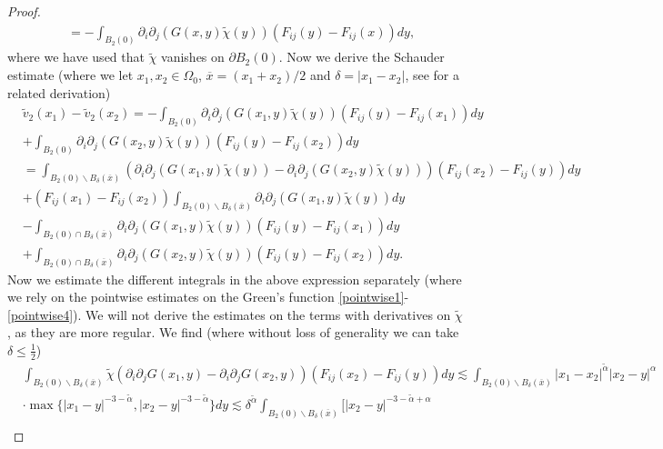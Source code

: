 \documentclass[12pt,a4paper]{article}
\theoremstyle{definition}
\theoremstyle{remark}
\numberwithin{equation}{section}
\begin{document}
\begin{appendices}
\begin{proof}
\begin{align*}
&= - \int_{B_2 (0)} \partial_i \partial_j (G(x,y) \widetilde{\chi} (y)) (F_{ij} (y) - F_{ij} (x) ) dy,
\end{align*}
where we have used that $\widetilde{\chi}$ vanishes on $\partial B_2 (0)$. Now we derive the Schauder estimate (where we let $x_1, x_2 \in \Omega_0$, $\overline{x} = (x_1 + x_2)/2$ and $\delta = \lvert x_1 - x_2 \rvert$, see \cite{jostPDE} for a related derivation)
\begingroup
\allowdisplaybreaks
\begin{align*}
&\widetilde{v}_2 (x_1) - \widetilde{v}_2 (x_2) =  -\int_{B_2 (0)} \partial_i \partial_j (G(x_1,y) \widetilde{\chi} (y)) (F_{ij} (y) - F_{ij} (x_1) ) dy  \\
&+ \int_{B_2 (0)} \partial_i \partial_j (G(x_2,y) \widetilde{\chi} (y)) (F_{ij} (y) - F_{ij} (x_2) ) dy \\
&= \int_{B_2 (0) \backslash B_\delta (\overline{x})} (\partial_i \partial_j (G(x_1,y) \widetilde{\chi} (y)) - \partial_i \partial_j (G(x_2,y) \widetilde{\chi} (y))) ( F_{ij} (x_2) - F_{ij} (y) ) dy \\
&+ (F_{ij} (x_1) - F_{ij} (x_2)) \int_{B_2 (0) \backslash B_\delta (\overline{x})} \partial_i \partial_{j} (G(x_1,y) \widetilde{\chi} (y)) dy \\
&-\int_{ B_2 (0) \cap B_\delta (\overline{x})} \partial_i \partial_j (G(x_1,y) \widetilde{\chi} (y)) (F_{ij} (y) - F_{ij} (x_1) ) dy  \\
&+ \int_{B_2 (0) \cap B_\delta (\overline{x})} \partial_i \partial_j (G(x_2,y) \widetilde{\chi} (y)) (F_{ij} (y) - F_{ij} (x_2) ) dy.
\end{align*}
\endgroup
Now we estimate the different integrals in the above expression separately (where we rely on the pointwise estimates on the Green's function \eqref{pointwise1}-\eqref{pointwise4}). We will not derive the estimates on the terms with derivatives on $\widetilde{\chi}$, as they are more regular. We find (where without loss of generality we can take $\delta \leq \frac{1}{2}$)
\begingroup
\allowdisplaybreaks
\begin{align*}
&\int_{B_2 (0) \backslash B_\delta (\overline{x})} \widetilde{\chi} (\partial_i \partial_j G(x_1, y) - \partial_i \partial_j G(x_2, y)) ( F_{ij} (x_2) - F_{ij} (y) ) dy \lesssim \int_{B_2 (0) \backslash B_\delta (\overline{x})} \lvert x_1 - x_2 \rvert^{\widetilde{\alpha}} \lvert x_2 - y \rvert^\alpha \\
&\cdot \max \{ \lvert x_1 - y \rvert^{ -3 - \widetilde{\alpha}} , \lvert x_2 - y \rvert^{ -3 - \widetilde{\alpha}} \} dy \lesssim \delta^{\widetilde{\alpha}} \int_{B_2 (0) \backslash B_\delta (\overline{x})} \bigg[ \lvert x_2 - y \rvert^{ -3 - \widetilde{\alpha} + \alpha} \\

\end{align*}
\end{proof}
\end{appendices}
\end{document}
